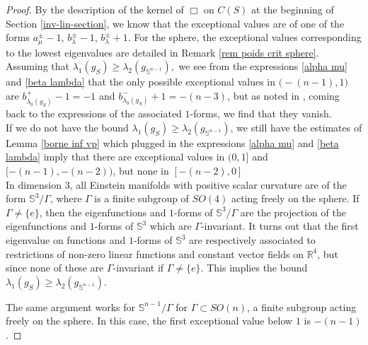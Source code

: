 \documentclass[a4paper,11pt,reqno]{amsart}
\numberwithin{equation}{section}
\begin{document}
	\begin{proof}
		By the description of the kernel of $\Box$ on $C(S)$ at the beginning of Section \ref{inv-lin-section}, we know that the exceptional values are of one of the forms $a^\pm_\mu-1$, $b^\pm_\lambda-1$, $b^\pm_\lambda+1$.
		For the sphere, the exceptional values corresponding to the lowest eigenvalues are detailed in Remark \ref{rem poids crit sphere}. Assuming that $\lambda_1(g_S)\geq \lambda_2(g_{\mathbb{S}^{n-1}}),$ we see from the expressions \eqref{alpha mu} and \eqref{beta lambda} that the only possible exceptional values in $\big(-(n-1),1\big)$ are $b^+_{\lambda_0(g_S)}-1= -1$ and $b^{-}_{\lambda_0(g_S)}+1 = -(n-3)$, but as noted in \cite[Lemma 3.2]{ozu2}, coming back to the expressions of the associated $1$-forms, we find that they vanish.
		\\
		
		If we do not have the bound $\lambda_1(g_S)\geq \lambda_2(g_{\mathbb{S}^{n-1}})$, we still have the estimates of Lemma \ref{borne inf vp} which plugged in the expressions \eqref{alpha mu} and \eqref{beta lambda} imply that there are exceptional values in $(0,1]$ and $[-(n-1),-(n-2))$, but none in $[-(n-2),0]$
		\\
		
		In dimension $3$, all Einstein manifolds with positive scalar curvature are of the form $\mathbb{S}^3\slash\Gamma$, where $\Gamma$ is a finite subgroup of $SO(4)$ acting freely on the sphere. If $\Gamma\neq \{e\}$, then the eigenfunctions and $1$-forms of $\mathbb{S}^3\slash\Gamma$ are the projection of the eigenfunctions and $1$-forms of $\mathbb{S}^3$ which are $\Gamma$-invariant. It turns out that the first eigenvalue on functions and $1$-forms of $\mathbb{S}^3$ are respectively associated to restrictions of non-zero linear functions and constant vector fields on $\mathbb{R}^4$, but since none of these are $\Gamma$-invariant if $\Gamma\neq \{e\}$. This implies the bound $\lambda_1(g_S)\geq \lambda_2(g_{\mathbb{S}^{n-1}})$.
		
		The same argument works for $\mathbb{S}^{n-1}\slash\Gamma$ for $\Gamma\subset SO(n)$, a finite subgroup acting freely on the sphere. In this case, the first exceptional value below $1$ is $-(n-1)$.
	\end{proof}
	
	
\end{document}
